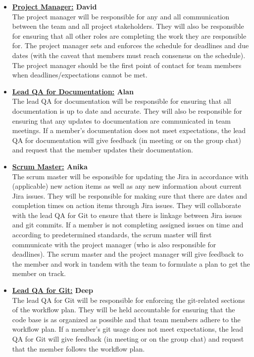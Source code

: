 \documentclass{article}
\begin{document}
\begin{itemize}
	\item \textbf{\underline{Project Manager:} David} \\
	The project manager will be responsible for any and all communication between the team and all project stakeholders. 
	They will also be responsible for ensuring that all other roles are completing the work they are responsible for. 
	The project manager sets and enforces the schedule for deadlines and due dates (with the caveat that members must reach consensus on the schedule). 
	The project manager should be the first point of contact for team members when deadlines/expectations cannot be met. 

	\item \textbf{\underline{Lead QA for Documentation:} Alan} \\
	The lead QA for documentation will be responsible for ensuring that all documentation is up to date and accurate.
	They will also be responsible for ensuring that any updates to documentation are communicated in team meetings. 
	If a member's documentation does not meet expectations, the lead QA for documentation will give feedback (in meeting or on the group chat) 
	and request that the member updates their documentation.\\
	
	\item \textbf{\underline{Scrum Master:} Anika} \\
	The scrum master will be esponsible for updating the Jira in accordance with (applicable) new action items as well as any new information about current Jira issues. 
	They will be responsible for making sure that there are dates and completion times on action items through Jira issues. 
	They will collaborate with the lead QA for Git to ensure that there is linkage between Jira issues and git commits. 
	If a member is not completing assigned issues on time and according to predetermined standards, the scrum master will first 
	communicate with the project manager (who is also responsible for deadlines).
	The scrum master and the project manager will give feedback to the member and work in tandem with the team to formulate a plan to get the member on track.\\

	\item \textbf{\underline{Lead QA for Git:} Deep} \\
	The lead QA for Git will be responsible for enforcing the git-related sections of the workflow plan. 
	They will be held accountable for ensuring that the code base is as organized as possible and that team members adhere to the workflow plan.
	If a member's git usage does not meet expectations, the lead QA for Git will give feedback (in meeting or on the group chat) and request that the member follows the workflow plan.\\


\end{itemize}
\end{document}
